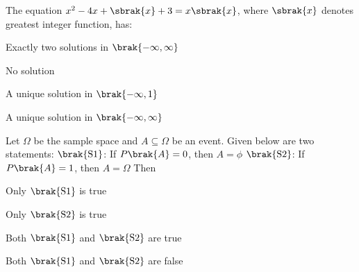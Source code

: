 \item The equation $x^2-4x+\sbrak{x}+3=x\sbrak{x}$, where $\sbrak{x}$ denotes greatest integer function, has:
\hfill{}
\begin{enumerate}
\begin{multicols}{2}
\item Exactly two solutions in $\brak{-\infty,\infty}$
\item No solution
\item A unique solution in $\brak{-\infty,1}$
\item A unique solution in $\brak{-\infty,\infty}$
\end{multicols}
\end{enumerate}

\item Let $\Omega$ be the sample space and $A\subseteq \Omega$ be an event. Given below are two statements:\newline
$\brak{\text{S} 1}$: If $P\brak{A}=0$, then $A=\phi$\newline
$\brak{\text{S} 2}$: If $P\brak{A}=1$, then $A=\Omega$\newline
Then

\hfill{}
\begin{enumerate}
\begin{multicols}{2}
\item Only $\brak{\text{S} 1}$ is true
\item Only $\brak{\text{S} 2}$ is true
\item Both $\brak{\text{S} 1}$ and $\brak{\text{S} 2}$ are true
\item Both $\brak{\text{S} 1}$ and $\brak{\text{S} 2}$ are false
\end{multicols}
\end{enumerate}


